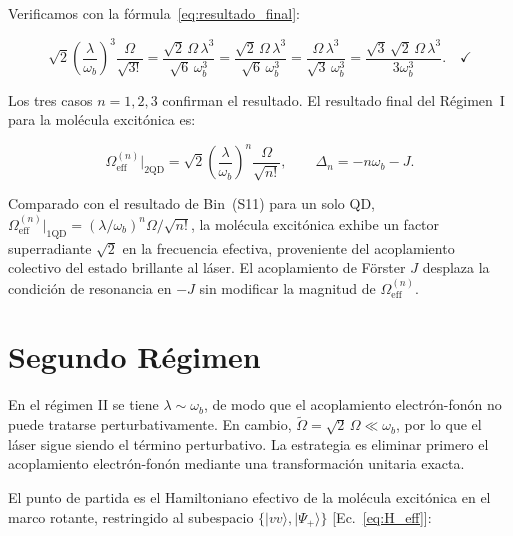 \documentclass[12pt]{article}
\begin{document}
	Verificamos con la f\'ormula~\eqref{eq:resultado_final}:
	
	\begin{equation}
		\sqrt{2}\left(\frac{\lambda}{\omega_b}\right)^3\frac{\Omega}{\sqrt{3!}}
		= \frac{\sqrt{2}\,\Omega\,\lambda^3}{\sqrt{6}\,\omega_b^3}
		= \frac{\sqrt{2}\,\Omega\,\lambda^3}{\sqrt{6}\,\omega_b^3}
		= \frac{\Omega\,\lambda^3}{\sqrt{3}\,\omega_b^3}
		= \frac{\sqrt{3}\,\sqrt{2}\,\Omega\,\lambda^3}{3\omega_b^3}. \quad\checkmark
	\end{equation}
	
	\medskip
	\noindent
	Los tres casos $n = 1, 2, 3$ confirman el resultado. El resultado final
	del R\'egimen~I para la mol\'ecula excit\'onica es:
	
	\begin{equation}
		\boxed{
			\Omega_\mathrm{eff}^{(n)}\big|_{2\mathrm{QD}}
			= \sqrt{2}\left(\frac{\lambda}{\omega_b}\right)^n\frac{\Omega}{\sqrt{n!}},
			\qquad
			\Delta_n = -n\omega_b - J.
		}
	\end{equation}
	
	\noindent
	Comparado con el resultado de Bin~(S11) para un solo QD,
	$\Omega_\mathrm{eff}^{(n)}\big|_\mathrm{1QD} = (\lambda/\omega_b)^n
	\Omega/\sqrt{n!}$, la mol\'ecula excit\'onica exhibe un factor superradiante
	$\sqrt{2}$ en la frecuencia efectiva, proveniente del acoplamiento colectivo
	del estado brillante al l\'aser. El acoplamiento de F\"orster $J$ desplaza
	la condici\'on de resonancia en $-J$ sin modificar la magnitud de
	$\Omega_\mathrm{eff}^{(n)}$.

\section{Segundo Régimen}
	
	En el r\'egimen II se tiene $\lambda \sim \omega_b$, de modo que el
	acoplamiento electr\'on-fon\'on no puede tratarse perturbativamente.
	En cambio, $\widetilde\Omega = \sqrt{2}\,\Omega \ll \omega_b$, por lo que
	el l\'aser sigue siendo el t\'ermino perturbativo. La estrategia es
	eliminar primero el acoplamiento electr\'on-fon\'on mediante una
	transformaci\'on unitaria exacta.
	
	El punto de partida es el Hamiltoniano efectivo de la mol\'ecula
	excit\'onica en el marco rotante,
	restringido al subespacio $\{|vv\rangle, |\Psi_+\rangle\}$
	[Ec.~\eqref{eq:H_eff}]:
	
\end{document}
